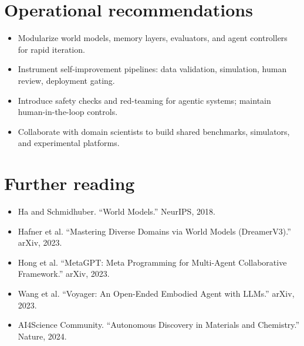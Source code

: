 \documentclass{article}
\begin{document}
\section*{Operational recommendations}
\begin{itemize}
  \item Modularize world models, memory layers, evaluators, and agent controllers for rapid iteration.
  \item Instrument self-improvement pipelines: data validation, simulation, human review, deployment gating.
  \item Introduce safety checks and red-teaming for agentic systems; maintain human-in-the-loop controls.
  \item Collaborate with domain scientists to build shared benchmarks, simulators, and experimental platforms.
\end{itemize}

\section*{Further reading}
\begin{itemize}
  \item Ha and Schmidhuber. ``World Models.'' NeurIPS, 2018.
  \item Hafner et al. ``Mastering Diverse Domains via World Models (DreamerV3).'' arXiv, 2023.
  \item Hong et al. ``MetaGPT: Meta Programming for Multi-Agent Collaborative Framework.'' arXiv, 2023.
  \item Wang et al. ``Voyager: An Open-Ended Embodied Agent with LLMs.'' arXiv, 2023.
  \item AI4Science Community. ``Autonomous Discovery in Materials and Chemistry.'' Nature, 2024.
\end{itemize}
\end{document}
